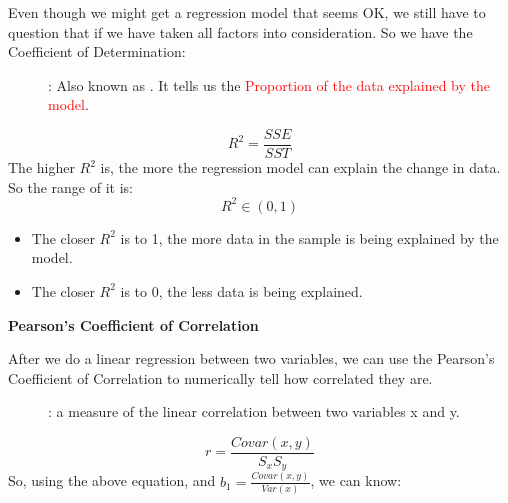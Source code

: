 Even though we might get a regression model that seems OK, we still have to question that if we have taken all factors into consideration. So we have the Coefficient of Determination:
\begin{description}
    \item[]: Also known as . It tells us the \textcolor{red}{Proportion of the data explained by the model}.
\end{description}
\begin{equation}
    R^2=\frac{SSE}{SST}
\end{equation}
The higher \(R^2\) is, the more the regression model can explain the change in data. So the range of it is:
\begin{equation}
    R^2 \in (0,1)
\end{equation}
\begin{itemize}
    \item The closer \(R^2\) is to 1, the more data in the sample is being explained by the model.
    \item The closer \(R^2\) is to 0, the less data is being explained. 
\end{itemize}
\vspace{6ex}
\begin{Center}
    \textbf{Pearson's Coefficient of Correlation}
\end{Center}
After we do a linear regression between two variables, we can use the Pearson's Coefficient of Correlation to numerically tell how correlated they are.
\begin{description}
    \item[]:  a measure of the linear correlation between two variables x and y.
\end{description}
\begin{equation}
    r=\frac{Covar(x,y)}{S_x S_y}
\end{equation}
So, using the above equation, and \(b_1=\frac{Covar(x,y)}{Var(x)}\), we can know:

